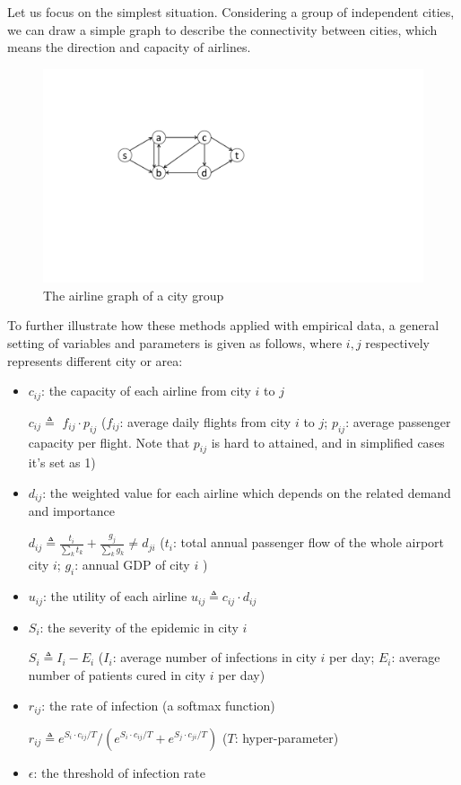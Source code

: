 \documentclass[11pt,twocolumn]{article}
\begin{document}
Let us focus on the simplest situation. Considering a group of independent cities, we can draw a simple graph to describe the connectivity between cities, which means the direction and capacity of airlines. 
\begin{figure}[H]
    \centering
    \includegraphics[width=0.7\columnwidth]{pic/graph1.pdf}
    \caption{The airline graph of a city group}
    \label{fig:graph1}
\end{figure}
To further illustrate how these methods applied with empirical data, a general setting of variables and parameters is given as follows, where $i,j$ respectively represents different city or area: 
\begin{itemize}
    \item $c_{ij}$: the capacity of each airline from city $i$ to $j$
    
    $c_{ij} \triangleq$ $f_{ij} \cdot p_{ij}$ ($f_{ij}$: average daily flights from city $i$ to $j$; $p_{ij}$: average passenger capacity per flight. Note that $p_{ij}$ is hard to attained, and in simplified cases it's set as 1)
    
    \item $d_{ij}$: the weighted value for each airline which depends on the related demand and importance
    
    $d_{ij} \triangleq \frac{t_i}{\sum_k t_k} + \frac{g_j}{\sum_k g_k} \neq d_{ji} $ ($t_i$: total annual passenger flow of the whole airport city $i$; $g_i$: annual GDP of city $i$ ) %
    
    \item $u_{ij}$: the utility of each airline
    $u_{ij} \triangleq c_{ij} \cdot d_{ij}$
    
    \item $S_i$: the severity of the epidemic in city $i$
    
    $S_i \triangleq I_i - E_i$ ($I_i$: average number of infections in city $i$ per day; $E_i$: average number of patients cured in city $i$ per day)
    
    \item $r_{ij}$: the rate of infection (a softmax function)
    
    $r_{ij} \triangleq e^{S_i \cdot c_{ij} / T} / (e^{S_i \cdot c_{ij} / T} + e^{S_j \cdot c_{ji} / T})$ ($T$: hyper-parameter)
    
    \item $\epsilon$: the threshold of infection rate
\end{itemize}
\end{document}
